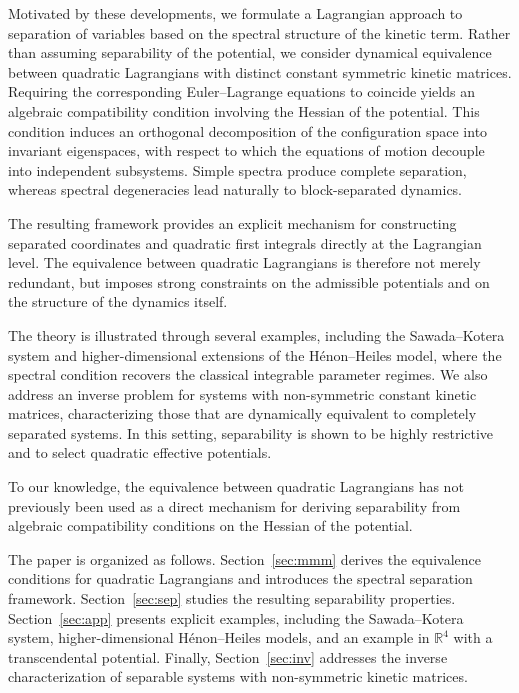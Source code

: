 \documentclass{rendiconti}
\begin{document}
Motivated by these developments, we formulate a Lagrangian approach to
separation of variables based on the spectral structure of the kinetic term.
Rather than assuming separability of the potential, we consider dynamical
equivalence between quadratic Lagrangians with distinct constant symmetric
kinetic matrices. Requiring the corresponding Euler--Lagrange equations to
coincide yields an algebraic compatibility condition involving the Hessian
of the potential. This condition induces an orthogonal decomposition of the
configuration space into invariant eigenspaces, with respect to which the
equations of motion decouple into independent subsystems. Simple spectra
produce complete separation, whereas spectral degeneracies lead naturally to
block-separated dynamics.

The resulting framework provides an explicit mechanism for constructing
separated coordinates and quadratic first integrals directly at the
Lagrangian level. The equivalence between quadratic Lagrangians is therefore
not merely redundant, but imposes strong constraints on the admissible
potentials and on the structure of the dynamics itself.

The theory is illustrated through several examples, including the
Sawada--Kotera system and higher-dimensional extensions of the
H\'{e}non--Heiles model, where the spectral condition recovers the classical
integrable parameter regimes. We also address an inverse problem for systems
with non-symmetric constant kinetic matrices, characterizing those that are
dynamically equivalent to completely separated systems. In this setting,
separability is shown to be highly restrictive and to select quadratic
effective potentials.

To our knowledge, the equivalence between quadratic Lagrangians has not
previously been used as a direct mechanism for deriving separability from
algebraic compatibility conditions on the Hessian of the potential.

The paper is organized as follows.
Section~\ref{sec:mmm} derives the equivalence conditions for quadratic
Lagrangians and introduces the spectral separation framework.
Section~\ref{sec:sep} studies the resulting separability properties.
Section~\ref{sec:app} presents explicit examples, including the
Sawada--Kotera system, higher-dimensional H\'{e}non--Heiles models, and an
example in $\mathbb{R}^4$ with a transcendental potential.
Finally, Section~\ref{sec:inv} addresses the inverse characterization of
separable systems with non-symmetric kinetic matrices.
\end{document}

